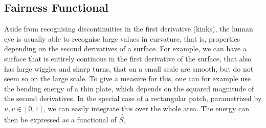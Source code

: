 \subsection{Fairness Functional}%
\label{subsec:fairnessthry}
Aside from recognising discontinuities in the first derivative (kinks), the human eye is usually able to recognise large values in curvature, that is, properties depending on the second derivatives of a surface. For example, we can have a surface that is entirely continous in the first derivative of the surface, that also has large wiggles and sharp turns, that on a small scale are smooth, but do not seem so on the large scale. %
To give a measure for this, one can for example use the bending energy of a thin plate, which depends on the squared magnitude of the second derivatives. In the special case of a rectangular patch, parametrized by $u,v\in \left[0,1\right]$, we can easily integrate this over the whole area. The energy can then be expressed as a functional of $\vec{S}$,

